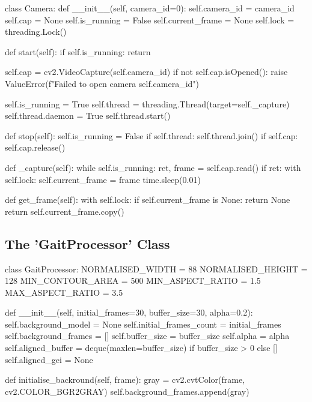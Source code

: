 \begin{appendices}
    \begin{code}
class Camera:
    def __init__(self, camera_id=0):
        self.camera_id = camera_id
        self.cap = None
        self.is_running = False
        self.current_frame = None
        self.lock = threading.Lock()

    def start(self):
        if self.is_running:
            return

        self.cap = cv2.VideoCapture(self.camera_id)
        if not self.cap.isOpened():
            raise ValueError(f"Failed to open camera {self.camera_id}")

        self.is_running = True
        self.thread = threading.Thread(target=self._capture)
        self.thread.daemon = True
        self.thread.start()

    def stop(self):
        self.is_running = False
        if self.thread:
            self.thread.join()
        if self.cap:
            self.cap.release()

    def _capture(self):
        while self.is_running:
            ret, frame = self.cap.read()
            if ret:
                with self.lock:
                    self.current_frame = frame
            time.sleep(0.01)

    def get_frame(self):
        with self.lock:
            if self.current_frame is None:
                return None
            return self.current_frame.copy()
    \end{code}

    \subsection{The 'GaitProcessor' Class}
    \label{app:gait-processor-implementation}
    \noindent
    \begin{code}
class GaitProcessor:
    NORMALISED_WIDTH = 88
    NORMALISED_HEIGHT = 128
    MIN_CONTOUR_AREA = 500
    MIN_ASPECT_RATIO = 1.5
    MAX_ASPECT_RATIO = 3.5

    def __init__(self, initial_frames=30, buffer_size=30, alpha=0.2):
        self.background_model = None
        self.initial_frames_count = initial_frames
        self.background_frames = []
        self.buffer_size = buffer_size
        self.alpha = alpha
        self.aligned_buffer = deque(maxlen=buffer_size) if buffer_size > 0 else []
        self.aligned_gei = None

    def initialise_backround(self, frame):
        gray = cv2.cvtColor(frame, cv2.COLOR_BGR2GRAY)
        self.background_frames.append(gray)


\end{code}
\end{appendices}
